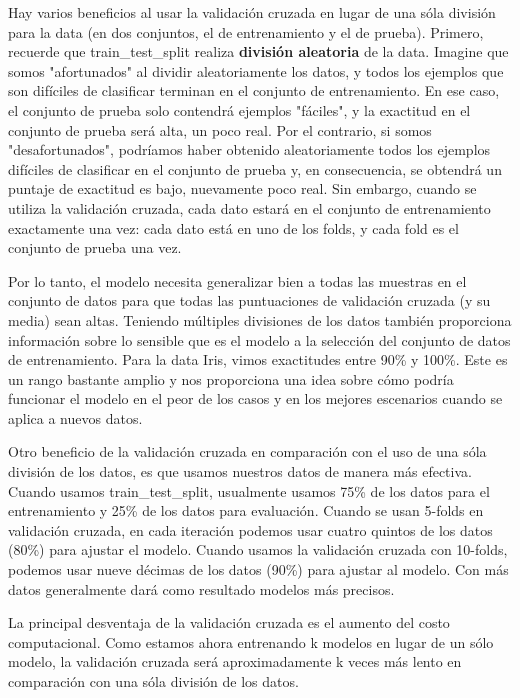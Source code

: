 Hay varios beneficios al usar la validación cruzada en lugar de una sóla división para la data (en dos conjuntos, el de entrenamiento y el de prueba). Primero, recuerde que {\ttfamily train\_test\_split} realiza 
{\bf{división aleatoria}} de la data.  Imagine que somos "{}afortunados"{} al dividir aleatoriamente los datos, y
todos los ejemplos que son difíciles de clasificar terminan en el conjunto de entrenamiento.
En ese caso, el conjunto  de  prueba  solo contendrá ejemplos "{}fáciles"{}, y 
la  exactitud en el conjunto de prueba será alta, un poco real. Por el contrario, si somos "{}desafortunados"{}, podríamos haber obtenido  aleatoriamente todos los ejemplos difíciles de clasificar en el conjunto de prueba y, en consecuencia, se obtendrá un puntaje de exactitud es bajo, nuevamente poco real. Sin embargo, cuando se utiliza la validación cruzada, cada dato estará en el conjunto de entrenamiento exactamente una vez:  cada dato está en uno de los  folds, y cada  fold es el conjunto de prueba una vez. 


Por lo tanto, el modelo necesita generalizar bien a todas las muestras en el conjunto de datos para que todas las puntuaciones de validación cruzada (y su media) sean altas.  Teniendo  múltiples divisiones de los datos también proporciona información sobre lo sensible que es el modelo a la selección del conjunto de datos de entrenamiento.  Para la data Iris, vimos exactitudes entre 90\% y 100\%.  Este es un rango bastante amplio y nos proporciona una idea sobre cómo podría funcionar el modelo en el peor de los casos y en los mejores escenarios cuando se aplica a nuevos datos.

Otro beneficio de la validación cruzada en comparación con el uso de una sóla división de los datos, es
que usamos nuestros datos de manera más efectiva. Cuando usamos  {\ttfamily train\_test\_split}, usualmente usamos 75\% de los datos para el entrenamiento  y 25\% de los datos para evaluación. Cuando se usan 5-folds en  validación cruzada, en cada iteración podemos usar cuatro quintos de los datos (80\%) para ajustar el
modelo.  Cuando usamos la validación cruzada con 10-folds, podemos usar nueve décimas de los datos
(90\%) para ajustar al modelo. Con más datos generalmente dará como resultado modelos más precisos.


La principal desventaja de la validación cruzada es el aumento del costo computacional. Como estamos 
ahora entrenando k modelos en lugar de un sólo modelo, la validación cruzada será aproximadamente k
veces más lento en comparación con una sóla división de los datos.\\


